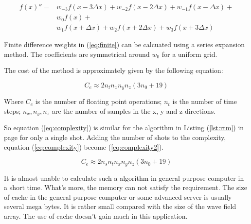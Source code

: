 \begin{equation}
  \begin{split}
    {f(x)}'' =
    & w_{-3}f\left( x - 3 \Delta x \right) +
      w_{-2}f\left( x - 2 \Delta x \right) +
      w_{-1}f\left( x - \Delta x   \right) + \\
    & w_{0}f\left( x \right) + \\
    & w_{1}f\left( x + \Delta x \right) +
      w_{2}f\left( x + 2 \Delta x \right) +
      w_{3}f\left( x + 3 \Delta x \right)
  \end{split}
  \label{eq:finite}
\end{equation}

Finite difference weights in (\ref{eq:finite}) can be calcuated using a
series expansion method. The coefficients are symmetrical around \( w_0 \)
for a uniform grid.

The cost of the method is approximately given by the following equation:

\begin{equation}
  C_e \approx 2n_t n_x n_y n_z \left( 3n_0 + 19 \right)
  \label{eq:complexity}
\end{equation}

Where \( C_e \) is the number of floating point operations; \( n_t \) is
the number of time steps; \( n_x , n_y , n_z \) are the number of samples
in the x, y and z directions.

So equation (\ref{eq:complexity}) is similar for the algorithm in Listing
(\ref{lst:rtm}) in page \pageref{lst:rtm} for only a single shot. Adding
the number of shots to the complexity, equation (\ref{eq:complexity})
become (\ref{eq:complexity2}).

\begin{equation}
  C_e \approx 2n_s n_t n_x n_y n_z \left( 3n_0 + 19 \right)
  \label{eq:complexity2}
\end{equation}

It is almost unable to calculate such a algorithm in general purpose
computer in a short time. What's more, the memory can not satisfy the
requirement. The size of cache in the general purpose computer or some advanced
server is usually several mega bytes. It is rather small compared with the
size of the wave field array. The use of cache doesn't gain much in this
application.
